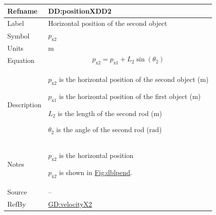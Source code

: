 \documentclass[12pt]{article}
\begin{document}
\vspace{\baselineskip}
\noindent
\begin{minipage}{\textwidth}
\begin{tabular}{>{\raggedright}p{}>{\raggedright\arraybackslash}p{}}
\toprule \textbf{Refname} & \textbf{DD:positionXDD2}
\label{DD:positionXDD2}
\\ \midrule
Label & Horizontal position of the second object
        
\\ \midrule
Symbol & ${p_{\text{x}2}}$
         
\\ \midrule
Units & ${\text{m}}$
        
\\ \midrule
Equation & \begin{displaymath}
           {p_{\text{x}2}}={p_{\text{x}1}}+{L_{2}} \sin\left({θ_{2}}\right)
           \end{displaymath}
\\ \midrule
Description & \begin{symbDescription}
              \item{${p_{\text{x}2}}$ is the horizontal position of the second object (${\text{m}}$)}
              \item{${p_{\text{x}1}}$ is the horizontal position of the first object (${\text{m}}$)}
              \item{${L_{2}}$ is the length of the second rod (${\text{m}}$)}
              \item{${θ_{2}}$ is the angle of the second rod (${\text{rad}}$)}
              \end{symbDescription}
\\ \midrule
Notes & ${p_{\text{x}2}}$ is the horizontal position
        
        ${p_{\text{x}2}}$ is shown in \hyperref[Figure:dblpend]{Fig:dblpend}.
        
\\ \midrule
Source & --
         
\\ \midrule
RefBy & \hyperref[GD:velocityX2]{GD:velocityX2}
        
\\ \bottomrule
\end{tabular}
\end{minipage}
\end{document}
